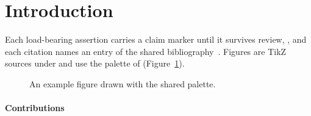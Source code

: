 \section{Introduction}
\label{sec:intro}


Each load-bearing assertion carries a claim marker until it survives review,
, and each citation names an entry of the shared
bibliography~\cite{lamport1994latex}. Figures are TikZ sources under
 and use the palette of 
(Figure~\ref{fig:example}).

\begin{figure}[h]
  \centering
  
  \caption{An example figure drawn with the shared palette.}
  \label{fig:example}
\end{figure}

\paragraph{Contributions}
